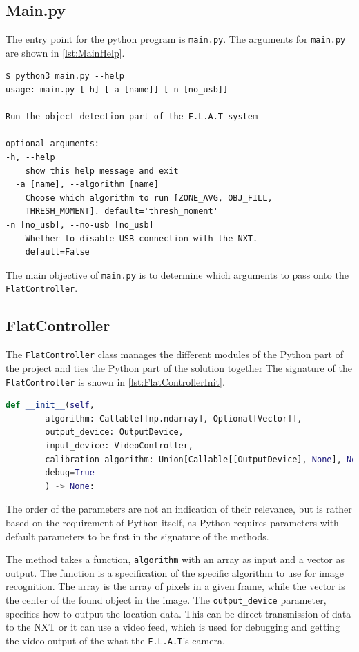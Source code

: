 \subsection{Main.py}
The entry point for the python program is \texttt{main.py}.
The arguments for \texttt{main.py}  are shown in \autoref{lst:MainHelp}.
\begin{lstlisting}[label={lst:MainHelp},caption={The help message of the commandline interface}]
$ python3 main.py --help
usage: main.py [-h] [-a [name]] [-n [no_usb]]

Run the object detection part of the F.L.A.T system

optional arguments:
-h, --help            
	show this help message and exit
  -a [name], --algorithm [name]
	Choose which algorithm to run [ZONE_AVG, OBJ_FILL,
	THRESH_MOMENT]. default='thresh_moment'
-n [no_usb], --no-usb [no_usb]
	Whether to disable USB connection with the NXT.
	default=False
\end{lstlisting}

The main objective of \texttt{main.py} is to determine which arguments to pass onto the \texttt{FlatController}.

\subsection{FlatController}\label{flatcontrollerimplementation}
The \texttt{FlatController} class manages the different modules of the Python part of the project and ties the Python part of the solution together
The signature of the \texttt{FlatController} is shown in \autoref{lst:FlatControllerInit}.

\begin{lstlisting}[language=Python,label={lst:FlatControllerInit},caption={Initialization method of the \texttt{FlatController} class}]
	def __init__(self,
		algorithm: Callable[[np.ndarray], Optional[Vector]],
		output_device: OutputDevice,
		input_device: VideoController,
		calibration_algorithm: Union[Callable[[OutputDevice], None], None] = None,
		debug=True
		) -> None:
\end{lstlisting}

The order of the parameters are not an indication of their relevance, but is rather based on the requirement of Python itself, as Python requires parameters with default parameters to be first in the signature of the methods.

The method takes a function, \texttt{algorithm} with an array as input and a vector as output.
The function is a specification of the specific algorithm to use for image recognition.
The array is the array of pixels in a given frame, while the vector is the center of the found object in the image.
The \texttt{output\_device} parameter, specifies how to output the location data.
This can be direct transmission of data to the NXT or it can use a video feed, which is used for debugging and getting the video output of the what the \texttt{F.L.A.T}'s camera.


